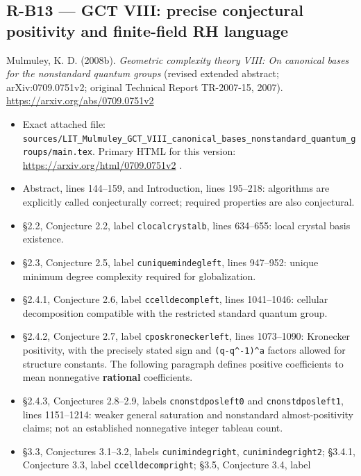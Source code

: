 \documentclass[11pt,a4paper]{article}
\providecommand{\tightlist}{\setlength{\itemsep}{0pt}\setlength{\parskip}{0pt}}
\theoremstyle{definition}\newtheorem{definition}{Definition}
\begin{document}
\subsection{R-B13 --- GCT VIII: precise conjectural positivity and
finite-field RH
language}\label{r-b13--gct-viii-precise-conjectural-positivity-and-finite-field-rh-language}

Mulmuley, K. D. (2008b). \emph{Geometric complexity theory VIII: On
canonical bases for the nonstandard quantum groups} (revised extended
abstract; arXiv:0709.0751v2; original Technical Report TR-2007-15,
2007). \url{https://arxiv.org/abs/0709.0751v2}

\begin{itemize}
\tightlist
\item
  Exact attached file:
  \texttt{sources/LIT\_Mulmuley\_GCT\_VIII\_canonical\_bases\_nonstandard\_quantum\_groups/main.tex}.
  Primary HTML for this version:
  \url{https://arxiv.org/html/0709.0751v2} .
\item
  Abstract, lines 144--159, and Introduction, lines 195--218: algorithms
  are explicitly called conjecturally correct; required properties are
  also conjectural.
\item
  §2.2, Conjecture 2.2, label \texttt{clocalcrystalb}, lines 634--655:
  local crystal basis existence.
\item
  §2.3, Conjecture 2.5, label \texttt{cuniquemindegleft}, lines
  947--952: unique minimum degree complexity required for globalization.
\item
  §2.4.1, Conjecture 2.6, label \texttt{ccelldecompleft}, lines
  1041--1046: cellular decomposition compatible with the restricted
  standard quantum group.
\item
  §2.4.2, Conjecture 2.7, label \texttt{cposkroneckerleft}, lines
  1073--1090: Kronecker positivity, with the precisely stated sign and
  \texttt{(q-q\^{}-1)\^{}a} factors allowed for structure constants. The
  following paragraph defines positive coefficients to mean nonnegative
  \textbf{rational} coefficients.
\item
  §2.4.3, Conjectures 2.8--2.9, labels \texttt{cnonstdposleft0} and
  \texttt{cnonstdposleft1}, lines 1151--1214: weaker general saturation
  and nonstandard almost-positivity claims; not an established
  nonnegative integer tableau count.
\item
  §3.3, Conjectures 3.1--3.2, labels \texttt{cunimindegright},
  \texttt{cunimindegright2}; §3.4.1, Conjecture 3.3, label
  \texttt{ccelldecompright}; §3.5, Conjecture 3.4, label

\end{itemize}
\end{document}
